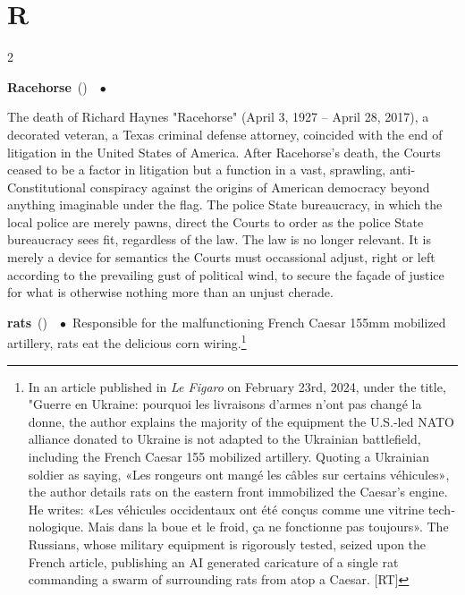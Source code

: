 \documentclass[10pt,a4paper,twoside]{article} %
\newcommand{\entry}[4]{\markboth{#1}{#1}\textbf{#1}\ {(#2)}\ \textit{#3}\ $\bullet$\ {#4}}  %
\begin{document}

\section*{R}

\begin{multicols}{2}

\entry{Racehorse} {} {} {The death of Richard Haynes "Racehorse" (April 3, 1927 – April 28, 2017), a decorated veteran, a Texas criminal defense attorney, coincided with the end of litigation in the United States of America. After Racehorse's death, the Courts ceased to be a factor in litigation but a function in a vast, sprawling, anti-Constitutional conspiracy against the origins of American democracy beyond anything imaginable under the flag. The police State bureaucracy, in which the local police are merely pawns, direct the Courts to order as the police State bureaucracy sees fit, regardless of the law. The law is no longer relevant. It is merely a device for semantics the Courts must occassional adjust, right or left according to the prevailing gust of political wind, to secure the façade of justice for what is otherwise nothing more than an unjust cherade.  


}

\entry{rats} {} {} {Responsible for the malfunctioning French Caesar 155mm mobilized artillery, rats eat the delicious corn wiring.\footnote{In an article published in \emph{Le Figaro} on February 23rd, 2024, under the title, "\textfrench{Guerre en Ukraine: pourquoi les livraisons d’armes n’ont pas changé la donne}, the author explains the majority of the equipment the U.S.-led NATO alliance donated to Ukraine is not adapted to the Ukrainian battlefield, including the French Caesar 155 mobilized artillery. Quoting a Ukrainian soldier as saying, \textfrench{«Les rongeurs ont mangé les câbles sur certains véhicules»}, the author details rats on the eastern front immobilized the Caesar's engine. He writes: \textfrench{ «Les véhicules occidentaux ont été conçus comme une vitrine technologique. Mais dans la boue et le froid, ça ne fonctionne pas toujours».} The Russians, whose military equipment is rigorously tested, seized upon the French article, publishing an AI generated caricature of a single rat commanding a swarm of surrounding rats from atop a Caesar. [RT]}
}


\end{multicols}
\end{document}
